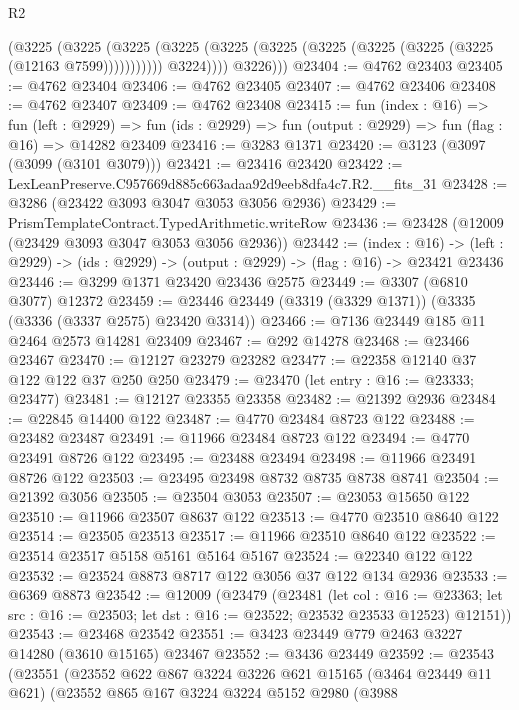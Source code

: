 \begin{lexlean}{R2}
\begin{coremodule}
                  (@3225
                    (@3225
                      (@3225
                        (@3225 (@3225 (@3225 (@3225 (@3225 (@3225 (@3225 (@12163 @7599)))))))))))
                  @3224))))
          @3226)))
@23404 := @4762 @23403
@23405 := @4762 @23404
@23406 := @4762 @23405
@23407 := @4762 @23406
@23408 := @4762 @23407
@23409 := @4762 @23408
@23415 := fun (index : @16) =>
  fun (left : @2929) =>
  fun (ids : @2929) => fun (output : @2929) => fun (flag : @16) => @14282 @23409
@23416 := @3283 @1371
@23420 := @3123 (@3097 (@3099 (@3101 @3079)))
@23421 := @23416 @23420
@23422 := LexLeanPreserve.C957669d885c663adaa92d9eeb8dfa4c7.R2.__fits_31
@23428 := @3286 (@23422 @3093 @3047 @3053 @3056 @2936)
@23429 := PrismTemplateContract.TypedArithmetic.writeRow
@23436 := @23428 (@12009 (@23429 @3093 @3047 @3053 @3056 @2936))
@23442 := (index : @16) ->
  (left : @2929) -> (ids : @2929) -> (output : @2929) -> (flag : @16) -> @23421 @23436
@23446 := @3299 @1371 @23420 @23436 @2575
@23449 := @3307 (@6810 @3077) @12372
@23459 := @23446 @23449 (@3319 (@3329 @1371)) (@3335 (@3336 (@3337 @2575) @23420 @3314))
@23466 := @7136 @23449 @185 @11 @2464 @2573 @14281 @23409
@23467 := @292 @14278
@23468 := @23466 @23467
@23470 := @12127 @23279 @23282
@23477 := @22358 @12140 @37 @122 @122 @37 @250 @250
@23479 := @23470 (let entry : @16 := @23333; @23477)
@23481 := @12127 @23355 @23358
@23482 := @21392 @2936
@23484 := @22845 @14400 @122
@23487 := @4770 @23484 @8723 @122
@23488 := @23482 @23487
@23491 := @11966 @23484 @8723 @122
@23494 := @4770 @23491 @8726 @122
@23495 := @23488 @23494
@23498 := @11966 @23491 @8726 @122
@23503 := @23495 @23498 @8732 @8735 @8738 @8741
@23504 := @21392 @3056
@23505 := @23504 @3053
@23507 := @23053 @15650 @122
@23510 := @11966 @23507 @8637 @122
@23513 := @4770 @23510 @8640 @122
@23514 := @23505 @23513
@23517 := @11966 @23510 @8640 @122
@23522 := @23514 @23517 @5158 @5161 @5164 @5167
@23524 := @22340 @122 @122
@23532 := @23524 @8873 @8717 @122 @3056 @37 @122 @134 @2936
@23533 := @6369 @8873
@23542 := @12009
    (@23479
      (@23481
        (let col : @16 := @23363;
        let src : @16 := @23503; let dst : @16 := @23522; @23532 @23533 @12523)
        @12151))
@23543 := @23468 @23542
@23551 := @3423 @23449 @779 @2463 @3227 @14280 (@3610 @15165) @23467
@23552 := @3436 @23449
@23592 := @23543
    (@23551
      (@23552
        @622
        @867
        @3224
        @3226
        @621
        @15165
        (@3464 @23449 @11 @621)
        (@23552
          @865
          @167
          @3224
          @3224
          @5152
          @2980
          (@3988

\end{coremodule}
\end{lexlean}
